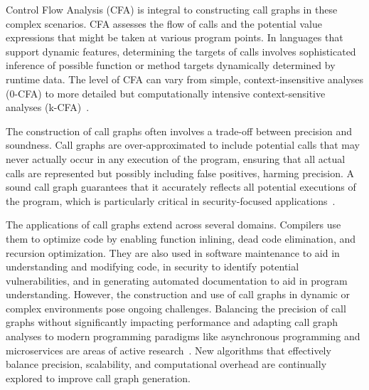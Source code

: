 Control Flow Analysis (CFA) is integral to constructing call graphs in these complex scenarios. CFA assesses the flow of calls and the potential value expressions that might be taken at various program points. In languages that support dynamic features, determining the targets of calls involves sophisticated inference of possible function or method targets dynamically determined by runtime data. The level of CFA can vary from simple, context-insensitive analyses (0-CFA) to more detailed but computationally intensive context-sensitive analyses (k-CFA)~\cite{shivers1991control}.

The construction of call graphs often involves a trade-off between precision and soundness. Call graphs are over-approximated to include potential calls that may never actually occur in any execution of the program, ensuring that all actual calls are represented but possibly including false positives, harming precision. A sound call graph guarantees that it accurately reflects all potential executions of the program, which is particularly critical in security-focused applications~\cite{sui2020recall}.

The applications of call graphs extend across several domains. Compilers use them to optimize code by enabling function inlining, dead code elimination, and recursion optimization. They are also used in software maintenance to aid in understanding and modifying code, in security to identify potential vulnerabilities, and in generating automated documentation to aid in program understanding. However, the construction and use of call graphs in dynamic or complex environments pose ongoing challenges. Balancing the precision of call graphs without significantly impacting performance and adapting call graph analyses to modern programming paradigms like asynchronous programming and microservices are areas of active research~\cite{luo2022depth}. New algorithms that effectively balance precision, scalability, and computational overhead are continually explored to improve call graph generation.


